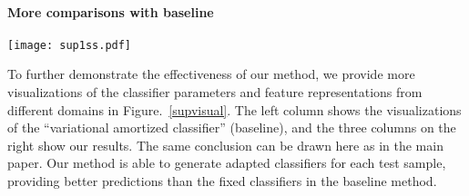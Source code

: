 \documentclass{article} \usepackage[table]{xcolor}
\begin{document}
\paragraph{More comparisons with baseline}
\begin{figure*}[t] 
\vspace{-3mm}
\centering 
\centerline{\texttt{[image: sup1ss.pdf]}} 
\caption{\textbf{Visualization of single sample generalization on PACS.} We plot the test samples and classifiers in the same 2D plane.  Different shapes denote different categories. Samples are in red, classifiers in blue. 
The baseline method produces the same classifier for all samples from each domain, while our method generates the classifier adapted to each target sample.
The two methods use the same test samples from each domain. The test sample is shown in the left-top corner of each sub-figure.
The visualization shows why our model performs better.
} 
\label{supvisual}
\vspace{-2mm}
\end{figure*} 
To further demonstrate the effectiveness of our method, we provide more visualizations of the classifier parameters and feature representations from different domains in Figure.~\ref{supvisual}.
The left column shows the visualizations of the “variational amortized classifier” (baseline), and the three columns on the right show our results.
The same conclusion can be drawn here as in the main paper.
Our method is able to generate adapted classifiers for each test sample, providing better predictions than the fixed classifiers in the baseline method.

\vspace{-2mm}
\end{document}
